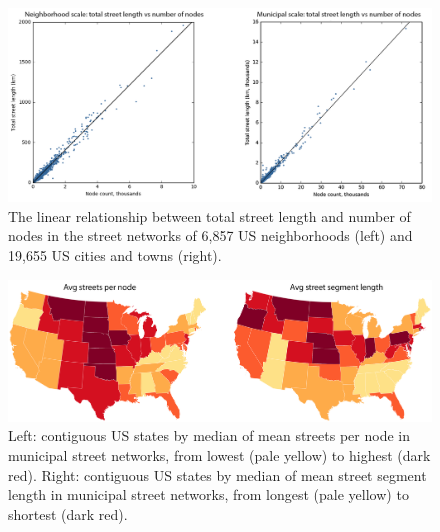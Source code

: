 \documentclass[Afour,sageh,times]{sagej}
\begin{document}
\begin{figure}
	\includegraphics[width=\textwidth]{fig03.png}
	\caption{The linear relationship between total street length and number of nodes in the street networks of 6,857 US neighborhoods (left) and 19,655 US cities and towns (right).}
	\label{fig:fig03}
\end{figure}

\begin{figure}
	\includegraphics[width=\textwidth]{fig04.png}
	\caption{Left: contiguous US states by median of mean streets per node in municipal street networks, from lowest (pale yellow) to highest (dark red). Right: contiguous US states by median of mean street segment length in municipal street networks, from longest (pale yellow) to shortest (dark red).}
	\label{fig:fig04}
\end{figure}
\end{document}
